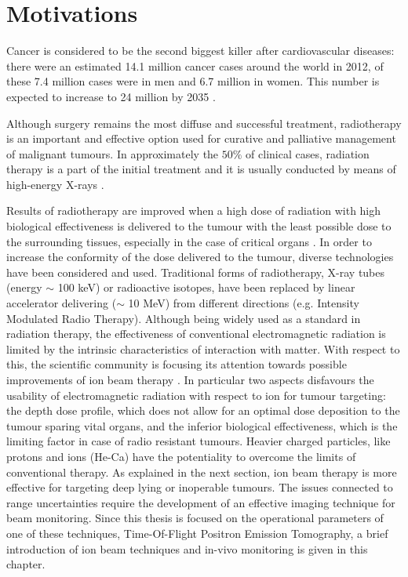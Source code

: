 \chapter{Motivations}

Cancer is considered to be the second biggest killer after cardiovascular diseases: there were an estimated 14.1 million cancer cases around the world in 2012, of these 7.4 million cases were in men and 6.7 million in women. This number is expected to increase to 24 million by 2035 \cite{Ferlay2012}.

Although surgery remains the most diffuse and successful treatment, radiotherapy is an important and effective option used for curative and palliative management of malignant tumours.
In approximately the $50\%$ of clinical cases, radiation therapy is a part of the initial treatment and it is usually conducted by means of high-energy X-rays \cite{Durante2010}.

Results of radiotherapy are improved when a high dose of radiation with high biological effectiveness is delivered to the tumour with the least possible dose to the surrounding tissues, especially in the case of critical organs \cite{Linz2011}.
In order to increase the conformity of the dose delivered to the tumour, diverse technologies have been considered and used.
Traditional forms of radiotherapy, X-ray tubes (energy $\sim$ 100 keV) or radioactive isotopes, have been replaced by linear accelerator delivering ($\sim$ 10 MeV) from different directions (e.g. Intensity Modulated Radio Therapy).
Although being widely used as a standard in radiation therapy, the effectiveness of conventional electromagnetic radiation is limited by the intrinsic characteristics of interaction with matter.
With respect to this, the scientific community is focusing its attention towards possible improvements of ion beam therapy \cite{Amaldi2011}.
In particular two aspects disfavours the usability of electromagnetic radiation with respect to ion for tumour targeting: the depth dose profile, which does not allow for an optimal dose deposition to the tumour sparing vital organs,
and the inferior biological effectiveness, which is the limiting factor in case of radio resistant tumours.
Heavier charged particles, like protons and ions (He-Ca) have the potentiality to overcome the limits of conventional therapy. 
As explained in the next section, ion beam therapy is more effective for targeting deep lying  or inoperable tumours.
The issues connected to range uncertainties require the development of an effective imaging technique for beam monitoring. 
Since this thesis is focused on the operational parameters of one of these techniques, Time-Of-Flight Positron Emission Tomography, a brief introduction of ion beam techniques and in-vivo monitoring is given in this chapter.

